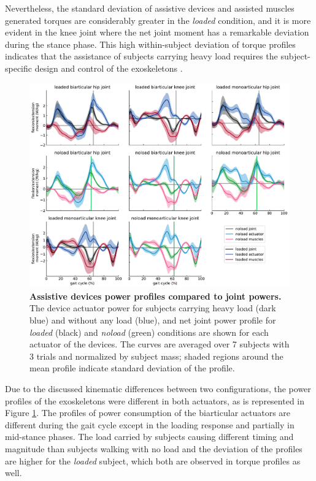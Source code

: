 \documentclass[10pt,letterpaper]{article}
\begin{document}
Nevertheless, the standard deviation of assistive devices and assisted muscles generated torques are considerably greater in the \textit{loaded} condition, and it is more evident in the knee joint where the net joint moment has a remarkable deviation during the stance phase. This high within-subject deviation of torque profiles indicates that the assistance of subjects carrying heavy load requires the subject-specific design and control of the exoskeletons \cite{2}.\\
\begin{figure}[ht]   
	\centering
	\includegraphics[width=\linewidth]{Ideal_Exo_MonovsBi_Figures/PaperFigure_Exoskeletons_Power.pdf}
	\vspace{1mm}
	\caption{{\small\textbf{Assistive devices power profiles compared to joint powers.} The device actuator power for subjects carrying heavy load (dark blue) and without any load (blue), and net joint power profile for \textit{loaded} (black) and \textit{noload} (green) conditions are shown for each actuator of the devices. The curves are averaged over 7 subjects with 3 trials and normalized by subject mass; shaded regions around the mean profile indicate standard deviation of the profile.}}
	\label{Fig_IdealExo_Power}
\end{figure}
Due to the discussed kinematic differences between two configurations, the power profiles of the exoskeletons were different in both actuators, as is represented in Figure \ref{Fig_IdealExo_Power}. The profiles of power consumption of the biarticular actuators are different during the gait cycle except in the loading response and partially in mid-stance phases. The load carried by subjects causing different timing and magnitude than subjects walking with no load and the deviation of the profiles are higher for the \textit{loaded} subject, which both are observed in torque profiles as well.\\
\end{document}
